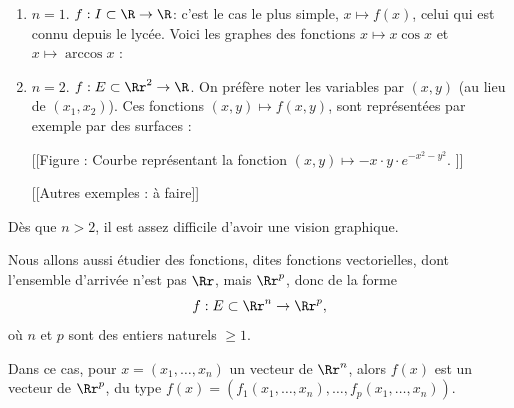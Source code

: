 \documentclass[12pt, class=report,crop=false]{standalone}
\begin{document}
\begin{exemple}
\sauteligne
\begin{enumerate}
\item $n=1$. $f: I \subset \R \rightarrow \R$:  c'est le cas le plus simple,
$x \mapsto f(x)$, celui qui est connu depuis le lycée. Voici les graphes des fonctions $x \mapsto x\cos x$ et $x \mapsto \arccos x$ :


\item $n=2$. $f: E \subset \Rr^2 \rightarrow \R$. 
On préfère noter les variables par $(x,y)$ (au lieu de $(x_1,x_2)$).
Ces fonctions $(x,y) \mapsto f(x,y)$, sont représentées par exemple par des surfaces :

[[Figure :
Courbe représentant la fonction $ (x,y) \mapsto -x \cdot y\cdot e^{-x^2-y^2}$. ]]

[[Autres exemples : à faire]]
\end{enumerate}
\end{exemple}

Dès que $n>2$, il est assez difficile d'avoir une vision graphique. 
  
\bigskip

Nous allons aussi étudier des fonctions, dites fonctions vectorielles, dont l'ensemble d'arrivée n'est pas $\Rr$, mais $\Rr^p$, donc de la forme 
\begin{equation*}
f:E \subset \Rr^n \rightarrow \Rr^p,
\end{equation*}
où $n$ et $p$ sont des entiers naturels $\ge 1$. 

Dans ce cas, pour $x=(x_1,\ldots,x_n)$ un vecteur de $\Rr^n$, alors $f(x)$ est un vecteur de $\Rr^p$, du type $f(x)=(f_1(x_1,\ldots,x_n), \ldots,f_p(x_1,\ldots,x_n))$.
\end{document}
